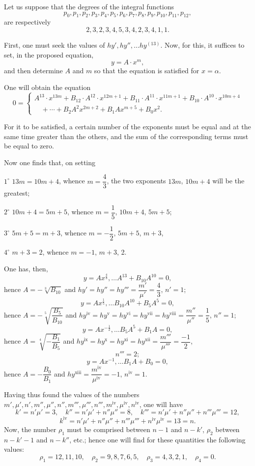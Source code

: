 \documentclass{article}
\begin{document}
Let us suppose that the degrees of the integral functions
\[ p_0, p_1, p_2, p_3, p_4, p_5, p_6, p_7, p_8, p_9, p_{10}, p_{11}, p_{12}, \]
are respectively
\[ 2, 3, 2, 3, 4, 5, 3, 4, 2, 3, 4, 1, 1. \]

First, one must seek the values of $hy', hy'', \ldots hy^{(13)}$. Now, for this, it suffices to set, in the proposed equation,
\[ y = A \cdot x^{m}, \]
and then determine $A$ and $m$ so that the equation is satisfied for $x = \alpha$.

One will obtain the equation
\[ 0 = \begin{cases} A^{13} \cdot x^{13m} + B_{12} \cdot A^{12} \cdot x^{12m+1} + B_{11} \cdot A^{11} \cdot x^{11m+1} + B_{10} \cdot A^{10} \cdot x^{10m+4} \\ \quad + \cdots + B_2 A^{2} x^{2m+2} + B_1 A x^{m+5} + B_0 x^{2}. \end{cases} \]

For it to be satisfied, a certain number of the exponents
must be equal and at the same time greater than the others, and the sum of the corresponding terms must be equal to zero.

Now one finds that, on setting

$1^\circ$ $13m = 10m+4$, whence $m = \dfrac{4}{3}$, the two exponents $13m$, $10m+4$ will be the greatest;

$2^\circ$ $10m+4 = 5m+5$, whence $m = \dfrac{1}{5}$, $10m+4$, $5m+5$;

$3^\circ$ $5m+5 = m+3$, whence $m = -\dfrac{1}{2}$, $5m+5$, $m+3$,

$4^\circ$ $m+3 = 2$, whence $m = -1$, $m+3$, 2.

One has, then,
\[ y = A x^{\frac{4}{3}}, \ldots A^{13} + B_{10}A^{10} = 0, \]
hence $A = -\sqrt[3]{B_{10}}$ and $hy' = hy'' = hy''' = \dfrac{m'}{\mu'} = \dfrac{4}{3}$, $n' = 1$;
\[ y = A x^{\frac{1}{5}}, \ldots B_{10}A^{10} + B_5 A^{5} = 0, \]
hence $A = -\sqrt[5]{\dfrac{B_5}{B_{10}}}$ and $hy^{\text{iv}} = hy^{\text{v}} = hy^{\text{vi}} = hy^{\text{vii}} = hy^{\text{viii}} = \dfrac{m''}{\mu''} = \dfrac{1}{5}$, $n'' = 1$;
\[ y = A x^{-\frac{1}{2}}, \ldots B_5 A^{5} + B_1 A = 0, \]
hence $A = \sqrt[4]{-\dfrac{B_1}{B_5}}$ and $hy^{\text{ix}} = hy^{\text{x}} = hy^{\text{xi}} = hy^{\text{xii}} = \dfrac{m'''}{\mu'''} = \dfrac{-1}{2}$,
\[ n''' = 2; \]
\[ y = A x^{-1}, \ldots B_1 A + B_0 = 0, \]
hence $A = -\dfrac{B_0}{B_1}$ and $hy^{\text{xiii}} = \dfrac{m^{\text{iv}}}{\mu^{\text{iv}}} = -1$, $n^{\text{iv}} = 1$.

Having thus found the values of the numbers $m', \mu', n', m'', \mu'', n'', m''', \mu''', n''', m^{\text{iv}}, \mu^{\text{iv}}, n^{\text{iv}}$, one will have
\[ k' = n'\mu' = 3, \quad k'' = n'\mu'+n''\mu'' = 8, \quad k''' = n'\mu'+n''\mu''+n'''\mu''' = 12, \]
\[ k^{\text{iv}} = n'\mu'+n''\mu''+n'''\mu'''+n^{\text{iv}}\mu^{\text{iv}} = 13 = n. \]
Now, the number $\rho_1$ must be comprised between $n-1$ and $n-k'$, $\rho_2$ between $n-k'-1$ and $n-k''$, etc.; hence one will find for these quantities the following values:
\[ \rho_1 = 12, 11, 10, \quad \rho_2 = 9, 8, 7, 6, 5, \quad \rho_3 = 4, 3, 2, 1, \quad \rho_4 = 0. \]
\end{document}
